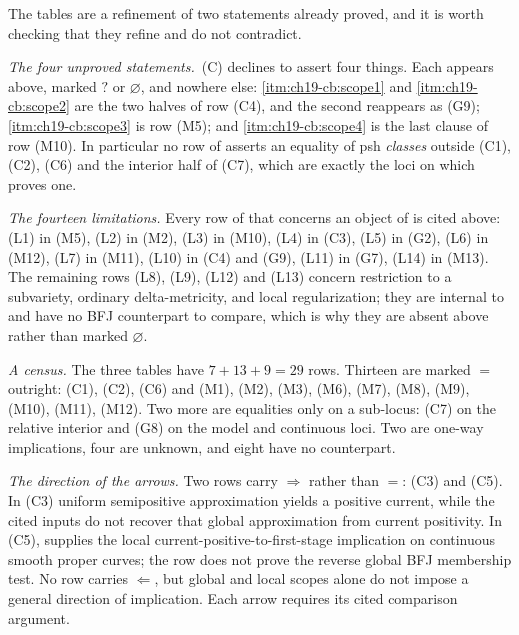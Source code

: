 The tables are a refinement of two statements already proved, and it is
worth checking that they refine and do not contradict.

\emph{The four unproved statements.}
\,(C) declines to assert four things.
Each appears above, marked $?$ or $\varnothing$, and nowhere else:
\cref{itm:ch19-cb:scope1} and \cref{itm:ch19-cb:scope2} are the two halves of
row (C4), and the second reappears as (G9);
\cref{itm:ch19-cb:scope3} is row (M5); and \cref{itm:ch19-cb:scope4} is the
last clause of row (M10).  In particular no row of
 asserts an equality of psh \emph{classes}
outside (C1), (C2), (C6) and the interior half of (C7), which are
exactly the loci on which  proves one.

\emph{The fourteen limitations.}  Every row of
 that concerns an object of
 is cited above: \textup{(L1)} in (M5), \textup{(L2)} in
(M2), \textup{(L3)} in (M10), \textup{(L4)} in (C3), \textup{(L5)} in (G2),
\textup{(L6)} in (M12), \textup{(L7)} in (M11), \textup{(L10)} in (C4) and
(G9), \textup{(L11)} in (G7), \textup{(L14)} in (M13).  The remaining rows
\textup{(L8)}, \textup{(L9)}, \textup{(L12)} and \textup{(L13)} concern
restriction to a subvariety, ordinary delta-metricity, and local
regularization; they are internal to  and have no BFJ
counterpart to compare, which is why they are absent above rather than
marked $\varnothing$.

\emph{A census.}  The three tables have $7+13+9=29$ rows.  Thirteen are
marked $=$ outright: (C1), (C2), (C6) and
(M1), (M2), (M3), (M6), (M7), (M8), (M9), (M10), (M11), (M12).  Two more are equalities
only on a sub-locus: (C7) on the relative interior and (G8) on the model and
continuous loci.  Two are one-way implications, four are unknown, and
eight have no counterpart.

\emph{The direction of the arrows.}  Two rows carry $\Rightarrow$
rather than $=$: (C3) and (C5).  In (C3) uniform semipositive
approximation yields a positive current, while the cited inputs do not
recover that global approximation from current positivity.  In (C5),
 supplies the local
current-positive-to-first-stage implication on continuous smooth proper
curves; the row does not prove the reverse global BFJ membership test.
No row carries $\Leftarrow$, but global and local scopes alone do not
impose a general direction of implication.  Each arrow requires its cited
comparison argument.

